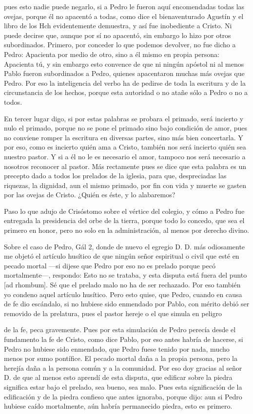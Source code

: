 pues esto nadie puede negarlo, si a Pedro le fueron aquí encomendadas todas las ovejas, porque él no apacentó a todas, como dice el bienaventurado Agustín y el libro de los Hch evidentemente demuestra, y así fue inobediente a Cristo. Ni puede decirse que, aunque por sí no apacentó, sin embargo lo hizo por otros subordinados. Primero, por conceder lo que podemos devolver, no fue dicho a Pedro: Apacienta por medio de otro, sino a él mismo en propia persona: Apacienta tú, y sin embargo esto convence de que ni ningún apóstol ni al menos Pablo fueron subordinados a Pedro, quienes apacentaron muchas más ovejas \marginpar{\small[302]} que Pedro. Por eso la inteligencia del verbo ha de pedirse de toda la escritura y de la circunstancia de los hechos, porque esta autoridad o no atañe sólo a Pedro o no a todos.

En tercer lugar digo, si por estas palabras se probara el primado, será incierto y nulo el primado, porque no se pone el primado sino bajo condición de amor, pues no conviene romper la escritura en diversas partes, sino más bien concertarla. Y por eso, como es incierto quién ama a Cristo, también nos será incierto quién sea nuestro pastor. Y si a él no le es necesario el amor, tampoco nos será necesario a nosotros reconocer al pastor. Más rectamente pues se dice que esta palabra es un precepto dado a todos los prelados de la iglesia, para que, despreciadas las riquezas, la dignidad, aun el mismo primado, por fin con vida y muerte se gasten por las ovejas de Cristo. ¿Quién es éste, y lo alabaremos?

Paso lo que adujo de Crisóstomo sobre el vértice del colegio, y cómo a Pedro fue entregada la presidencia del orbe de la tierra, porque todo lo concedo, que sea el primero en honor, pero no solo en la administración, al menos por derecho divino.

Sobre el caso de Pedro, Gál 2, donde de nuevo el egregio D. D. más odiosamente me objetó el artículo husítico de que ningún señor espiritual o civil que esté en pecado mortal —si dijese que Pedro por eso no es prelado porque pecó mortalmente—, respondo: Esto no se trataba, y esta disputa está fuera del punto [ad rhombum]. Sé que el prelado malo no ha de ser rechazado. Por eso también yo condeno aquel artículo husítico. Pero esto quise, que Pedro, cuando en causa de fe dio escándalo, si no hubiese sido enmendado por Pablo, con mérito debió ser removido de la prelatura, pues el pastor hereje o el que simula en peligro

de la fe, peca gravemente. Pues por esta simulación de Pedro perecía desde el fundamento la fe de Cristo, como dice Pablo, por eso antes habría de hacerse, si Pedro no hubiese sido enmendado, que Pedro fuese tenido por nada, mucho menos por sumo pontífice. El pecado mortal daña a la propia persona, pero la herejía daña a la persona común y a la comunidad. Por eso doy gracias al señor D. de que al menos esto aprendí de esta disputa, que edificar sobre la piedra significa estar bajo el prelado, sea bueno, sea malo. Pues esta significación de la edificación y de la piedra confieso que antes ignoraba, porque dijo: aun si Pedro hubiese caído mortalmente, aún habría permanecido piedra, esto es primero.

